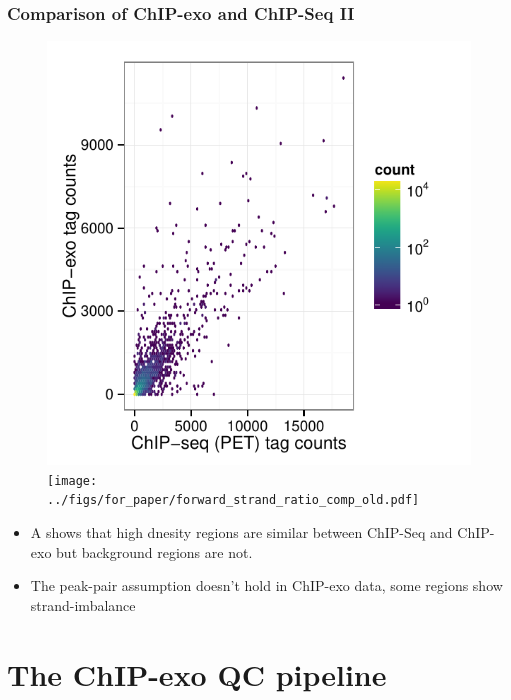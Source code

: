 \documentclass[compress,table,xcolor=dvipsnames]{beamer}\usepackage[]{graphicx}\usepackage[]{color}
\begin{document}
\begin{frame}
  \frametitle{Comparison of ChIP-exo and ChIP-Seq II}

\begin{figure}[H]
  \centering
  \includegraphics[width = .5\textwidth,page = 3 ]{../figs/for_paper/ChIPseqPET_ChIPexo_tagCount_comparison.pdf}
  \texttt{[image: ../figs/for\_paper/forward\_strand\_ratio\_comp\_old.pdf]}
\end{figure}

{\small
\begin{itemize}
\item A shows that high dnesity regions are similar between ChIP-Seq
  and ChIP-exo but background regions are not.
\item The peak-pair assumption doesn't hold in ChIP-exo data, some
  regions show strand-imbalance
\end{itemize}
}

\end{frame}

\section{The ChIP-exo QC pipeline}
\end{document}
